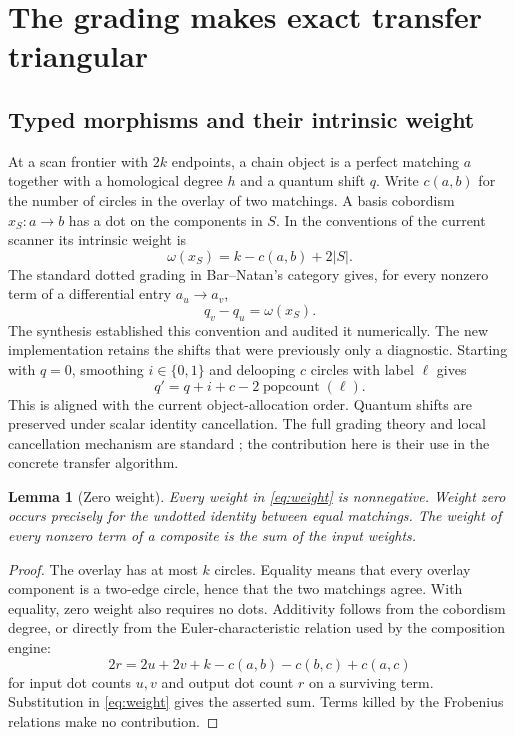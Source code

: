 \documentclass[11pt]{article}
\newtheorem{lemma}[theorem]{Lemma}
\theoremstyle{definition}
\theoremstyle{remark}
\begin{document}
\section{The grading makes exact transfer triangular}
\label{sec:graded}

\subsection{Typed morphisms and their intrinsic weight}
At a scan frontier with $2k$ endpoints, a chain object is a perfect matching $a$ together with a homological degree $h$ and a quantum shift $q$. Write $c(a,b)$ for the number of circles in the overlay of two matchings. A basis cobordism $x_S:a\to b$ has a dot on the components in $S$. In the conventions of the current scanner its intrinsic weight is
\begin{equation}
 \omega(x_S)=k-c(a,b)+2|S|.
 \label{eq:weight}
\end{equation}
The standard dotted grading in Bar--Natan's category gives, for every nonzero term of a differential entry $a_u\to a_v$,
\begin{equation}
 q_v-q_u=\omega(x_S).
 \label{eq:q}
\end{equation}
The synthesis established this convention and audited it numerically. The new implementation retains the shifts that were previously only a diagnostic. Starting with $q=0$, smoothing $i\in\{0,1\}$ and delooping $c$ circles with label $\ell$ gives
\begin{equation}
 q'=q+i+c-2\operatorname{popcount}(\ell).
 \label{eq:qrec}
\end{equation}
This is aligned with the current object-allocation order. Quantum shifts are preserved under scalar identity cancellation. The full grading theory and local cancellation mechanism are standard \cite{barnatan,fastkh}; the contribution here is their use in the concrete transfer algorithm.

\begin{lemma}[Zero weight]
Every weight in \eqref{eq:weight} is nonnegative. Weight zero occurs precisely for the undotted identity between equal matchings. The weight of every nonzero term of a composite is the sum of the input weights.
\end{lemma}
\begin{proof}
The overlay has at most $k$ circles. Equality means that every overlay component is a two-edge circle, hence that the two matchings agree. With equality, zero weight also requires no dots. Additivity follows from the cobordism degree, or directly from the Euler-characteristic relation used by the composition engine:
\[
2r=2u+2v+k-c(a,b)-c(b,c)+c(a,c)
\]
for input dot counts $u,v$ and output dot count $r$ on a surviving term. Substitution in \eqref{eq:weight} gives the asserted sum. Terms killed by the Frobenius relations make no contribution.
\end{proof}
\end{document}
